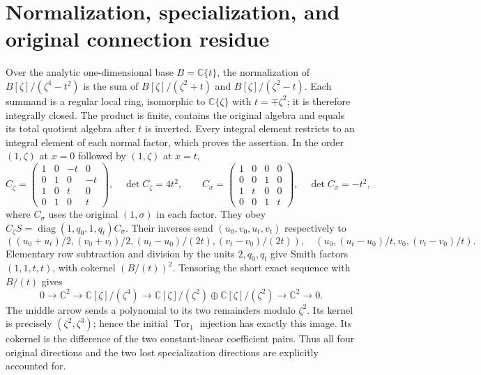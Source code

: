 \documentclass[11pt]{article}
\newcommand{\C}{\mathbb C}
\newcommand{\diag}{\operatorname{diag}}
\begin{document}
\section{Normalization, specialization, and original connection residue}
Over the analytic one-dimensional base $B=\C\{t\}$, the normalization of
$B[\zeta]/(\zeta^4-t^2)$ is the sum of
$B[\zeta]/(\zeta^2+t)$ and $B[\zeta]/(\zeta^2-t)$.
Each summand is a regular local ring, isomorphic to $\C\{\zeta\}$ with
$t=\mp\zeta^2$; it is therefore integrally closed. The product is finite,
contains the original algebra and equals its total quotient algebra
after $t$ is inverted. Every integral element restricts to an integral
element of each normal factor, which proves the assertion.
In the order $(1,\zeta)$ at $x=0$ followed by $(1,\zeta)$ at $x=t$,
\begin{equation}
 C_\zeta=\begin{pmatrix}1&0&-t&0\\0&1&0&-t\\
 1&0&t&0\\0&1&0&t\end{pmatrix},\quad\det C_\zeta=4t^2,
 \qquad
 C_\sigma=\begin{pmatrix}1&0&0&0\\0&0&1&0\\
 1&t&0&0\\0&0&1&t\end{pmatrix},\quad\det C_\sigma=-t^2,
 \tag{ECC12}
\end{equation}
where $C_\sigma$ uses the original $(1,\sigma)$ in each factor.
They obey $C_\zeta S=\diag(1,q_0,1,q_t)C_\sigma$.
Their inverses send $(u_0,v_0,u_t,v_t)$ respectively to
\begin{equation}
 \left((u_0+u_t)/2,(v_0+v_t)/2,(u_t-u_0)/(2t),(v_t-v_0)/(2t)\right),
 \quad
 \left(u_0,(u_t-u_0)/t,v_0,(v_t-v_0)/t\right).
 \tag{ECC13}
\end{equation}
Elementary row subtraction and division by the units $2,q_0,q_t$
give Smith factors $(1,1,t,t)$, with cokernel $(B/(t))^2$.
Tensoring the short exact sequence with $B/(t)$ gives
\begin{equation}
 0\to\C^2\to\C[\zeta]/(\zeta^4)
 \to\C[\zeta]/(\zeta^2)\oplus\C[\zeta]/(\zeta^2)
 \to\C^2\to0.
 \tag{ECC14}
\end{equation}
The middle arrow sends a polynomial to its two remainders modulo
$\zeta^2$. Its kernel is precisely $(\zeta^2,\zeta^3)$; hence the initial
$\operatorname{Tor}_1$ injection has exactly this image. Its cokernel is
the difference of the two constant-linear coefficient pairs. Thus all
four original directions and the two lost specialization directions
are explicitly accounted for.
\end{document}
